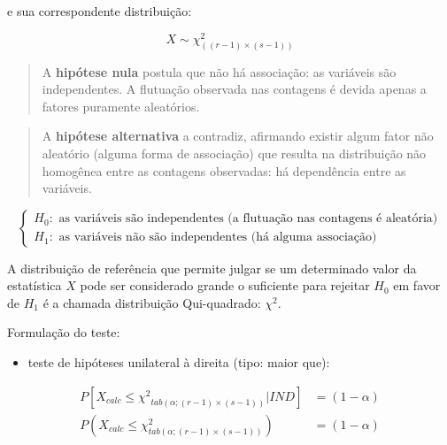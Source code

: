 \documentclass[
]{book}
\providecommand{\tightlist}{%
  \setlength{\itemsep}{0pt}\setlength{\parskip}{0pt}}
\begin{document}
\hfill\break

e sua correspondente distribuição:

\hfill\break

\[
X\sim \chi^{2}_{((r-1)\times(s-1))}
\]

\hfill\break

\begin{quote}
A \textbf{hipótese nula} postula que não há associação: as variáveis são independentes. A flutuação observada nas contagens é devida apenas a fatores puramente aleatórios.
\end{quote}

\begin{quote}
A \textbf{hipótese alternativa} a contradiz, afirmando existir algum fator não aleatório (alguma forma de associação) que resulta na distribuição não homogênea entre as contagens observadas: há dependência entre as variáveis.
\end{quote}

\hfill\break

\[
\begin{cases}
H_{0}: \text{ as variáveis são independentes (a flutuação nas contagens é aleatória}) \\
H_{1}: \text{ as variáveis não são independentes (há alguma associação}) 
\end{cases}
\]

\hfill\break

A distribuição de referência que permite julgar se um determinado valor da estatística \(X\) pode ser considerado grande o suficiente para rejeitar \(H_{0}\) em favor de \(H_{1}\) é a chamada distribuição Qui-quadrado: \(\chi^{2}\).

\hfill\break

Formulação do teste:

\hfill\break

\begin{itemize}
\tightlist
\item
  teste de hipóteses unilateral à direita (tipo: maior que):
\end{itemize}

\hfill\break

\begin{align*}
P[X_{calc} \le {\chi^{2}}_{tab \left(\alpha ;(r-1)\times(s-1) \right)} | IND]& =(1-\alpha)\\
P(X_{calc}  \le  \chi^{2}_{tab \left(\alpha ;(r-1)\times(s-1) \right)})&=(1-\alpha)
\end{align*}
\end{document}
